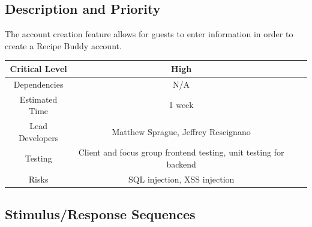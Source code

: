 \documentclass{scrreprt}
\begin{document}
\subsection{Description and Priority}

The account creation feature allows for guests to enter information in order to create a \gls{Recipe Buddy} account.

\begin{center}
    \begin{tabular}{| c | c | c | c |}
        \hline
        Critical Level  & High                                                              \\
        \hline
        Dependencies    & N/A                                                               \\
        \hline
        Estimated Time  & 1 week                                                            \\
        \hline
        Lead Developers & Matthew Sprague, Jeffrey Rescignano                               \\
        \hline
        Testing         & Client and focus group \gls{frontend} testing,
                          \gls{unit testing} for \gls{backend}                              \\
        \hline
        Risks           & \gls{SQL injection}, \gls{XSS injection}                          \\
        \hline
    \end{tabular}
\end{center}

\subsection{Stimulus/Response Sequences}
\end{document}
